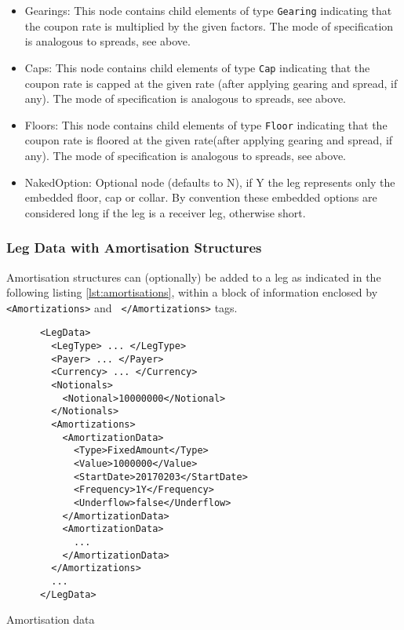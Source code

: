 \begin{itemize}
\item Gearings: This node contains child elements of type \lstinline!Gearing! indicating that the coupon rate is
  multiplied by the given factors. The mode of specification is analogous to spreads, see above.

\item Caps: This node contains child elements of type \lstinline!Cap! indicating that the coupon rate is capped at the
  given rate (after applying gearing and spread, if any). The mode of specification is analogous to spreads, see above.

\item Floors: This node contains child elements of type \lstinline!Floor! indicating that the coupon rate is floored at
  the given rate(after applying gearing and spread, if any). The mode of specification is analogous to spreads, see
  above.

\item NakedOption: Optional node (defaults to N), if Y the leg represents only the embedded floor, cap or collar. 
By convention these embedded options are considered long if the leg is a receiver leg, otherwise short. 

\end{itemize}

\subsubsection{Leg Data with Amortisation Structures}
\label{ss:amortisationdata}

Amortisation structures can (optionally) be added to a leg as
indicated in the following listing \ref{lst:amortisations}, within a
block of information enclosed by {\tt <Amortizations>} and {\tt
  </Amortizations>} tags.

\begin{listing}[H]
\begin{verbatim}
      <LegData>
        <LegType> ... </LegType>
        <Payer> ... </Payer>
        <Currency> ... </Currency>
        <Notionals>
          <Notional>10000000</Notional>
        </Notionals>
        <Amortizations>
          <AmortizationData>
            <Type>FixedAmount</Type>
            <Value>1000000</Value>
            <StartDate>20170203</StartDate>
            <Frequency>1Y</Frequency>
            <Underflow>false</Underflow>
          </AmortizationData>
          <AmortizationData>
            ...
          </AmortizationData>
        </Amortizations>
        ...
      </LegData>
\end{verbatim}
\caption{Amortisation data}
\label{lst:amortisations}
\end{listing}

